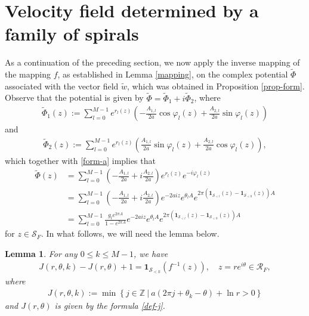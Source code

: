 \documentclass[11pt, letterpaper, reqno]{amsart}
\numberwithin{equation}{section}
\theoremstyle{definition}
\theoremstyle{plain}
\newtheorem{lem}[defi]{Lemma}
\numberwithin{equation}{section}
\def\Z{\mathbb{Z}}
\def\RR{\mathcal{R}}
\def\SS{\mathcal{S}}
\begin{document}
\section{Velocity field determined by a family of spirals}\label{sec-velocity-m}
As a continuation of the preceding section, we now apply the inverse mapping of the mapping $f$, as established in Lemma \ref{mapping}, on the complex potential $\tilde\Phi$ associated with the vector field $\tilde{w}$, which was obtained in Proposition \ref{prop-form}. Observe that the potential is given by $\tilde\Phi = \tilde \Phi_{1} + i \tilde\Phi_{2}$, where 
\begin{align*}
\tilde\Phi_{1}(z) := \sum_{l=0}^{M-1} e^{r_{l}(z)} \left(-\frac{A_{1,l}}{2a}\cos\varphi_{l}(z) + \frac{A_{2,l}}{2a}\sin\varphi_{l}(z)\right)
\end{align*}
and
\begin{align*}
\tilde\Phi_{2}(z) := \sum_{l=0}^{M-1} e^{r_{l}(z)} \left(\frac{A_{1,l}}{2a}\sin\varphi_{l}(z) + \frac{A_{2,l}}{2a}\cos\varphi_{l}(z)\right),
\end{align*}
which together with \eqref{form-a} implies that 
\begin{equation}\label{eq-bba}
\begin{aligned}
\tilde\Phi(z) & = \sum_{l=0}^{M-1} \left(-\frac{A_{1,l}}{2a} + i\frac{A_{2,l}}{2a} \right) e^{r_{l}(z)} e^{-i\varphi_{l}(z)}\\
& = \sum_{l=0}^{M-1} \left(-\frac{A_{1,l}}{2a} + i\frac{A_{2,l}}{2a}\right)e^{-2aiz}e^{\theta_{l}A}e^{2\pi\left(\mathbf{1}_{\SS_{<l}}(z)-\mathbf{1}_{\SS_{<0}}(z)\right)A} \\
& = \sum_{l=0}^{M-1} \frac{g_{l} e^{2\pi A}}{1-e^{2\pi A}}e^{-2aiz}e^{\theta_{l}A}e^{2\pi\left(\mathbf{1}_{\SS_{<l}}(z)-\mathbf{1}_{\SS_{<0}}(z)\right)A}
\end{aligned}
\end{equation}
for $z\in \SS_{F}$. In what follows, we will need the lemma below.
\begin{lem}\label{lem-winding}
For any $0\le k \le M-1$, we have
\begin{align*}
J(r,\theta, k) - J(r,\theta) + 1 = \mathbf{1}_{\SS_{<k}}(f^{-1}(z)), \quad z = re^{i\theta}\in\RR_{F},
\end{align*}
where 
\begin{align*}
J (r,\theta ,k ) := \min \left\{ j\in \Z  \ | \  a(2\pi j + \theta_k - \theta ) + \ln r >0 \right\}
\end{align*}
and $J(r,\theta)$ is given by the formula \eqref{def-j}.
\end{lem}
\end{document}
